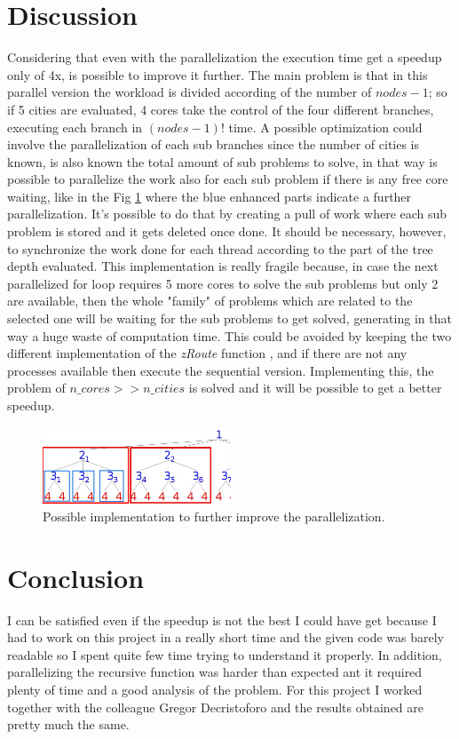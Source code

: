 \documentclass[11pt,conference]{IEEEtran}
\begin{document}
\section{Discussion}
Considering that even with the parallelization the execution time get a speedup only of 4x, is possible to improve it further. The main problem is that in this parallel version the workload is divided according of the number of $nodes - 1$; so if 5 cities are evaluated, 4 cores take the control of the four different branches, executing each branch in $(nodes - 1)!$ time. A possible optimization could involve the parallelization of each sub branches since the number of cities is known, is also known the total amount of sub problems to solve, in that way is possible to parallelize the work also for each sub problem if there is any free core waiting, like in the Fig \ref{fig:optimized-tree} where the blue enhanced parts indicate a further parallelization. It's possible to do that by creating a pull of work where each sub problem is stored and it gets deleted once done. It should be necessary, however, to synchronize the work done for each thread according to the part of the tree depth evaluated. This implementation is really fragile because, in case the next parallelized for loop requires 5 more cores to solve the sub problems but only 2 are available, then the whole "family" of problems which are related to the selected one will be waiting for the sub problems to get solved, generating in that way a huge waste of computation time. This could be avoided by keeping the two different implementation of the \textit{zRoute} function , and if there are not any processes available then execute the sequential version.
\newline
Implementing this, the problem of $n\_cores >> n\_cities$ is solved and it will be possible to get a better speedup.

\begin{figure}[h!]
  \centering
    \includegraphics[width=0.5\textwidth]{optimized-tree}
    \caption{Possible implementation to further improve the parallelization.}
    \label{fig:optimized-tree}
\end{figure}

\section{Conclusion}
I can be satisfied even if the speedup is not the best I could have get because I had to work on this project in a really short time and the given code was barely readable so I spent quite few time trying to understand it properly.
In addition, parallelizing the recursive function was harder than expected ant it required plenty of time and a good analysis of the problem.
For this project I worked together with the colleague Gregor Decristoforo and the results obtained are pretty much the same.



\end{document}
